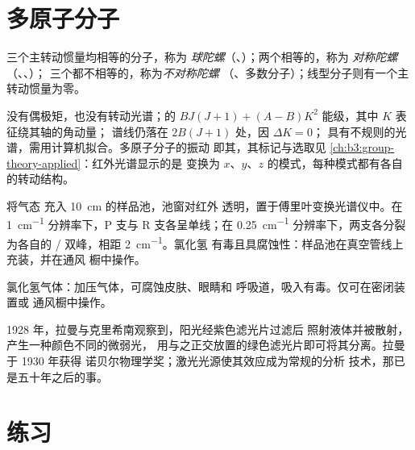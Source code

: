 \section{多原子分子}

\begin{definition}[转子的类型]\label{def:b3:rovibrational-spectroscopy:rotor-types}
三个主转动惯量均相等的分子，称为
\emph{球陀螺}（、）；两个相等的，称为
\emph{对称陀螺}（、、）；
三个都不相等的，称为\emph{不对称陀螺}
（、多数分子）；线型分子则有一个主转动惯量为零。
\end{definition}

没有偶极矩，也没有转动光谱；的
$BJ(J+1) + (A - B)K^2$ 能级，其中 $K$ 表征绕其轴的角动量；
谱线仍落在 $2B(J+1)$ 处，因 $\Delta K = 0$；
具有不规则的光谱，需用计算机拟合。多原子分子的振动
即其，其标记与选取见
\cref{ch:b3:group-theory-applied}：红外光谱显示的是
变换为 $x$、$y$、$z$ 的模式，每种模式都有各自的转动结构。

\begin{inthelab}[红外光谱仪中的气体样品池]
将气态  充入 \qty{10}{cm} 的样品池，池窗对红外
透明，置于傅里叶变换光谱仪中。在 \qty{1}{cm^{-1}}
分辨率下，P 支与 R 支各呈单线；在 \qty{0.25}{cm^{-1}}
分辨率下，两支各分裂为各自的 / 双峰，相距 \qty{2}{cm^{-1}}。氯化氢
有毒且具腐蚀性：样品池在真空管线上充装，并在通风
橱中操作。
\end{inthelab}

\begin{safety}{}
氯化氢气体：加压气体，可腐蚀皮肤、眼睛和
呼吸道，吸入有毒。仅可在密闭装置或
通风橱中操作。
\end{safety}

\begin{history}[拉曼，1928 年]
1928 年，拉曼与克里希南观察到，阳光经紫色滤光片过滤后
照射液体并被散射，产生一种颜色不同的微弱光，
用与之正交放置的绿色滤光片即可将其分离。拉曼于 1930 年获得
诺贝尔物理学奖；激光光源使其效应成为常规的分析
技术，那已是五十年之后的事。
\end{history}

\section{练习}

